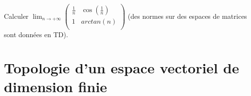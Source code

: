 \documentclass[french,11pt,twoside]{VcCours}
\begin{document}
%
%
%
%
%
%
%
%
%
%
%

\begin{ApplicationDirecte} Calculer $\lim_{n \rightarrow + \infty} \begin{pmatrix}
\frac{1}{n} & \cos \left( \frac{1}{n} \right) \\
1 & arctan(n) \\
\end{pmatrix}$ (des normes sur des espaces de matrices sont données en TD).
\end{ApplicationDirecte}

\section{Topologie d'un espace vectoriel de dimension finie}
\end{document}
